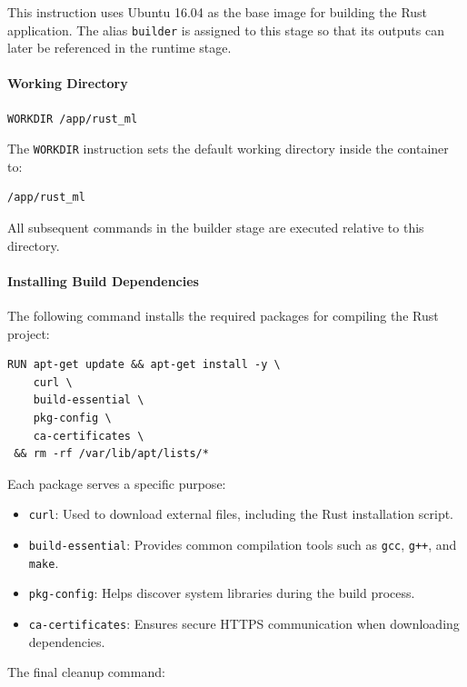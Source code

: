 \documentclass{ieeeaccess}
\begin{document}
This instruction uses Ubuntu 16.04 as the base image for building the Rust application. The alias \texttt{builder} is assigned to this stage so that its outputs can later be referenced in the runtime stage.

\paragraph{Working Directory}

\begin{lstlisting}
WORKDIR /app/rust_ml
\end{lstlisting}

The \texttt{WORKDIR} instruction sets the default working directory inside the container to:

\begin{lstlisting}
/app/rust_ml
\end{lstlisting}

All subsequent commands in the builder stage are executed relative to this directory.

\paragraph{Installing Build Dependencies}

The following command installs the required packages for compiling the Rust project:

\begin{lstlisting}
RUN apt-get update && apt-get install -y \
    curl \
    build-essential \
    pkg-config \
    ca-certificates \
 && rm -rf /var/lib/apt/lists/*
\end{lstlisting}

Each package serves a specific purpose:

\begin{itemize}
    \item \texttt{curl}: Used to download external files, including the Rust installation script.
    \item \texttt{build-essential}: Provides common compilation tools such as \texttt{gcc}, \texttt{g++}, and \texttt{make}.
    \item \texttt{pkg-config}: Helps discover system libraries during the build process.
    \item \texttt{ca-certificates}: Ensures secure HTTPS communication when downloading dependencies.
\end{itemize}

The final cleanup command:
\end{document}
